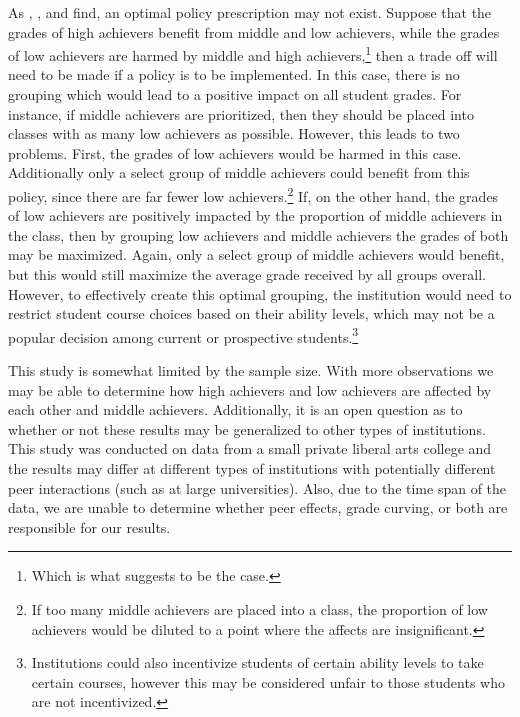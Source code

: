 As \citet{burke2013classroom}, \citet{carman2012classroom}, and \citet{ding2007peers} find, an optimal policy prescription may not exist.
Suppose that the grades of high achievers benefit from middle and low achievers, while the grades of low achievers are harmed by middle and high achievers,\footnote{Which is what  suggests to be the case.} then a trade off will need to be made if a policy is to be implemented. 
In this case, there is no grouping which would lead to a positive impact on all student grades. 
For instance, if middle achievers are prioritized, then they should be placed into classes with as many low achievers as possible. 
However, this leads to two problems.
First, the grades of low achievers would be harmed in this case.
Additionally only a select group of middle achievers could benefit from this policy, since there are far fewer low achievers.\footnote{If too many middle achievers are placed into a class, the proportion of low achievers would be diluted to a point where the affects are insignificant.}
If, on the other hand, the grades of low achievers are positively impacted by the proportion of middle achievers in the class, then by grouping low achievers and middle achievers the grades of both may be maximized.
Again, only a select group of middle achievers would benefit, but this would still maximize the average grade received by all groups overall.
However, to effectively create this optimal grouping, the institution would need to restrict student course choices based on their ability levels, which may not be a popular decision among current or prospective students.\footnote{Institutions could also incentivize students of certain ability levels to take certain courses, however this may be considered unfair to those students who are not incentivized.}

This study is somewhat limited by the sample size. 
With more observations we may be able to determine how high achievers and low achievers are affected by each other and middle achievers.
Additionally, it is an open question as to whether or not these results may be generalized to other types of institutions. 
This study was conducted on data from a small private liberal arts college and the results may differ at different types of institutions with potentially different peer interactions (such as at large universities). 
Also, due to the time span of the data, we are unable to determine whether peer effects, grade curving, or both are responsible for our results. 

